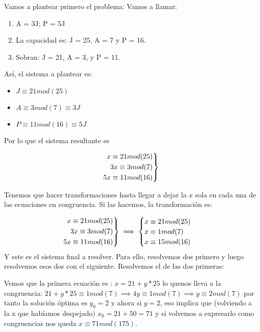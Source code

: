 \documentclass[11pt, a4paper, titlepage]{article}
\newenvironment{rcases}
  {\left.\begin{aligned}}
  {\end{aligned}\right\rbrace}
\begin{document}
Vamos a plantear primero el problema: Vamos a llamar:
\begin{enumerate}
	\item A = 3J; P = 5J
	\item La capacidad es: J = 25, A = 7 y P = 16.
	\item Sobran: J = 21, A = 3, y P = 11.
\end{enumerate}

Así, el sistema a plantear es:

\begin{itemize}
	\item $J \equiv 21 mod(25)$
	\item $A \equiv 3 mod(7) \equiv 3J$
	\item $P \equiv 11 mod(16) \equiv 5J$
\end{itemize}

Por lo que el sistema resultante es

\[
\begin{rcases}
	x \equiv 21 mod(25)\\
	3x \equiv 3 mod(7)\\
	5x \equiv 11 mod(16)
\end{rcases}
\]

Tenemos que hacer transformaciones hasta llegar a dejar la $x$ sola en cada una de las ecuaciones en congruencia. Si las hacemos, la transformación es:



\[
\begin{rcases}
	x \equiv 21 mod(25)\\
	3x \equiv 3 mod(7)\\
	5x \equiv 11 mod(16)
\end{rcases} \implies \begin{cases}
	 x \equiv 21 mod(25)\\
	 x \equiv 1 mod(7)\\
	 x \equiv 15 mod(16)
\end{cases}
\]
Y este es el sistema final a resolver. Para ello, resolvemos dos primero y luego resolvemos esos dos con el siguiente. Resolvemos el de las dos primeras:

Vemos que la primera ecuación es : $x = 21+y*25$ lo quenos lleva a la congruencia: $21 +y*25 \equiv 1 mod(7) \implies 4y \equiv 1 mod(7) \implies y \equiv 2 mod(7)$ por tanto la solución óptima es $y_0 = 2$ y ahora si $y=2$, eso implica que (volviendo a la x que habíamos despejado) $x_0 = 21+50 = 71$ y si volvemos a expresarlo como congruencias nos queda $x \equiv 71 mod(175)$. 
\end{document}
